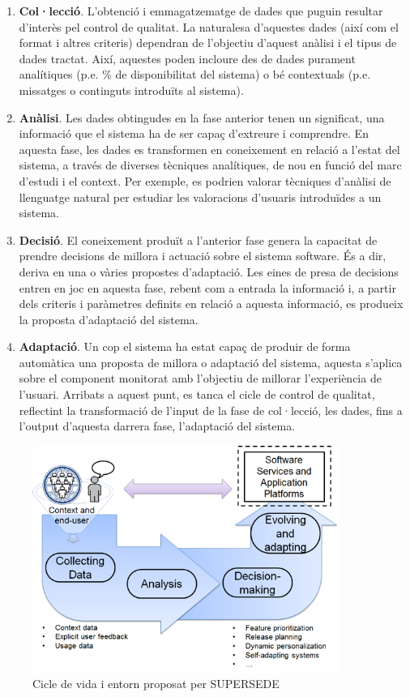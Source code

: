 \begin{enumerate}
\item \textbf{Col·lecció}. L'obtenció i emmagatzematge de dades que puguin resultar d'interès pel control de qualitat. La naturalesa d'aquestes dades (així com el format i altres criteris) dependran de l'objectiu d'aquest anàlisi i el tipus de dades tractat. Així, aquestes poden incloure des de dades purament analítiques (p.e. \% de disponibilitat del sistema) o bé contextuals (p.e. missatges o continguts introduïts al sistema).
\item \textbf{Anàlisi}. Les dades obtingudes en la fase anterior tenen un significat, una informació que el sistema ha de ser capaç d'extreure i comprendre. En aquesta fase, les dades es transformen en coneixement en relació a l'estat del sistema, a través de diverses tècniques analítiques, de nou en funció del marc d'estudi i el context. Per exemple, es podrien valorar tècniques d'anàlisi de llenguatge natural per estudiar les valoracions d'usuaris introduïdes a un sistema.
\item \textbf{Decisió}. El coneixement produït a l'anterior fase genera la capacitat de prendre decisions de millora i actuació sobre el sistema software. És a dir, deriva en una o vàries propostes d'adaptació. Les eines de presa de decisions entren en joc en aquesta fase, rebent com a entrada la informació i, a partir dels criteris i paràmetres definits en relació a aquesta informació, es produeix la proposta d'adaptació del sistema.
\item \textbf{Adaptació}. Un cop el sistema ha estat capaç de produir de forma automàtica una proposta de millora o adaptació del sistema, aquesta s'aplica sobre el component monitorat amb l'objectiu de millorar l'experiència de l'usuari. Arribats a aquest punt, es tanca el cicle de control de qualitat, reflectint la transformació de l'input de la fase de col·lecció, les dades, fins a l'output d'aquesta darrera fase, l'adaptació del sistema.
\end{enumerate}

\begin{figure}
\centering
\includegraphics[width=10cm]{Figures/Figure2}
\decoRule
\caption[Cicle de vida i entorn proposat per SUPERSEDE]{Cicle de vida i entorn proposat per SUPERSEDE}
\label{fig:Figura2}
\end{figure}

